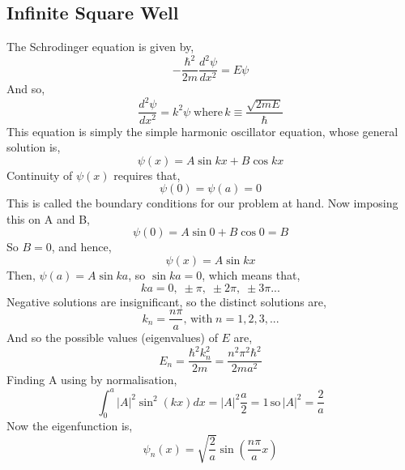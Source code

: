 \subsection{Infinite Square Well}
The Schrodinger equation is given by,
\begin{equation}
	-\frac{\hbar^2}{2m}\frac{d^2\psi}{dx^2}=E\psi
\end{equation}
And so,
\begin{equation}
	\frac{d^2\psi}{dx^2}=k^2\psi \; \text{where}\, k\equiv\frac{\sqrt{2mE}}{\hbar}
\end{equation}
This equation is simply the simple harmonic oscillator equation, whose general solution is,	\begin{equation}
	\psi(x)=A\sin kx + B\cos kx
\end{equation}
Continuity of $\psi(x)$ requires that,
	\begin{equation*}
		\psi(0)=\psi(a)=0
	\end{equation*}
		This is called the boundary conditions for our problem at hand. Now imposing this on A and B,
		\begin{equation}
			\psi(0)=A\sin 0 + B\cos 0 =B
		\end{equation}
		So $B=0$, and hence,
		\begin{equation}
			\psi(x)=A\sin kx
		\end{equation}
		Then, $\psi(a)=A\sin ka$, so $\sin ka=0$, which means that,
		\begin{equation}
			ka=0, \; \pm\pi, \; \pm2\pi, \; \pm3\pi...
		\end{equation}
			Negative solutions are insignificant, so the distinct solutions are,
		\begin{equation}
			k_n=\frac{n\pi}{a}, \, \text{with}\; n=1,2,3,...
		\end{equation}
	And so the possible values (eigenvalues) of $E$ are,
	\begin{equation}
		E_n=\frac{\hbar^2k^2_n}{2m}=\frac{n^2\pi^2\hbar^2}{2ma^2}
	\end{equation}
		Finding A using by normalisation,
	\begin{equation}
		\int_{0}^{a}|A|^2\sin^2(kx)dx=|A|^2\frac{a}{2}=1 \, \text{so} \, |A|^2=\frac{2}{a}
	\end{equation}
	Now the eigenfunction is,
	\begin{equation}
		\psi_n(x)=\sqrt{\frac{2}{a}}\sin \left(\frac{n\pi}{a}x\right)
	\end{equation}
	
